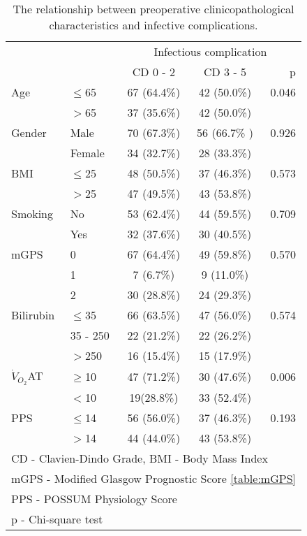 \begin{table}[p]
	\centering
	\caption{The relationship between preoperative clinicopathological characteristics and infective complications.}
	\label{table:crp_comp_preop_factors}
	\renewcommand{\arraystretch}{1.2} %
	\setlength{\tabcolsep}{12pt} %
	\begin{tabular}{|l l | c c r|}
		\hline
		                  &          &  \multicolumn{3}{c|}{Infectious complication}  \\
		                  &          & CD 0 - 2    & CD 3 - 5     & p                 \\ \hline
		Age               & $\leq$65 & 67 (64.4\%) & 42 (50.0\%)  & 0.046             \\
		                  & $>$65    & 37 (35.6\%) & 42 (50.0\%)  &  \\
		Gender            & Male     & 70 (67.3\%) & 56 (66.7\% ) & 0.926             \\
		                  & Female   & 34 (32.7\%) & 28 (33.3\%)  &  \\
		BMI               & $\leq$25 & 48 (50.5\%) & 37 (46.3\%)  & 0.573             \\
		                  & $>$25    & 47 (49.5\%) & 43 (53.8\%)  &  \\
		Smoking           & No       & 53 (62.4\%) & 44 (59.5\%)  & 0.709             \\
		                  & Yes      & 32 (37.6\%) & 30 (40.5\%)  &  \\
		mGPS              & 0        & 67 (64.4\%) & 49 (59.8\%)  & 0.570             \\
		                  & 1        & 7 (6.7\%)   & 9 (11.0\%)   &  \\
		                  & 2        & 30 (28.8\%) & 24 (29.3\%)  &  \\
		Bilirubin         & $\leq$35 & 66 (63.5\%) & 47 (56.0\%)  & 0.574             \\
		                  & 35 - 250 & 22 (21.2\%) & 22 (26.2\%)  &  \\
		                  & $>$250   & 16 (15.4\%) & 15 (17.9\%)  &  \\
		$\dot{V}_{O_2}$AT & $\geq$10 & 47 (71.2\%) & 30 (47.6\%)  & 0.006             \\
		                  & $<$10    & 19(28.8\%)  & 33 (52.4\%)  &  \\
		PPS               & $\leq$14 & 56 (56.0\%) & 37 (46.3\%)  & 0.193             \\
		                  & $>$14    & 44 (44.0\%) & 43 (53.8\%)  &  \\ \hline
		\multicolumn{5}{l}{CD - Clavien-Dindo Grade, BMI - Body Mass Index}           \\
		\multicolumn{5}{l}{mGPS - Modified Glasgow Prognostic Score \ref{table:mGPS}} \\
		\multicolumn{5}{l}{PPS - POSSUM Physiology Score}                             \\
		\multicolumn{5}{l}{p - Chi-square test}
	\end{tabular}
\end{table}


		
		
		
